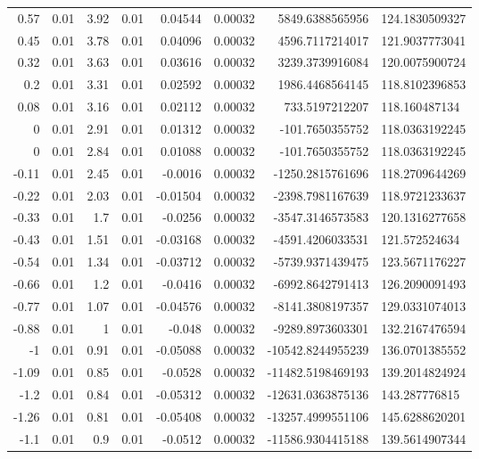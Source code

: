 \documentclass[a4paper]{article}
\begin{document}
\begin{table}[htbp]
\begin{tabular}{rlrlrlrl}
    0.57  & 0.01 & 3.92 & 0.01 & 0.04544  & 0.00032 & 5849.6388565956   & 124.1830509327 \\
    0.45  & 0.01 & 3.78 & 0.01 & 0.04096  & 0.00032 & 4596.7117214017   & 121.9037773041 \\
    0.32  & 0.01 & 3.63 & 0.01 & 0.03616  & 0.00032 & 3239.3739916084   & 120.0075900724 \\
    0.2   & 0.01 & 3.31 & 0.01 & 0.02592  & 0.00032 & 1986.4468564145   & 118.8102396853 \\
    0.08  & 0.01 & 3.16 & 0.01 & 0.02112  & 0.00032 & 733.5197212207    & 118.160487134  \\
    0     & 0.01 & 2.91 & 0.01 & 0.01312  & 0.00032 & -101.7650355752   & 118.0363192245 \\
    0     & 0.01 & 2.84 & 0.01 & 0.01088  & 0.00032 & -101.7650355752   & 118.0363192245 \\
    -0.11 & 0.01 & 2.45 & 0.01 & -0.0016  & 0.00032 & -1250.2815761696  & 118.2709644269 \\
    -0.22 & 0.01 & 2.03 & 0.01 & -0.01504 & 0.00032 & -2398.7981167639  & 118.9721233637 \\
    -0.33 & 0.01 & 1.7  & 0.01 & -0.0256  & 0.00032 & -3547.3146573583  & 120.1316277658 \\
    -0.43 & 0.01 & 1.51 & 0.01 & -0.03168 & 0.00032 & -4591.4206033531  & 121.572524634  \\
    -0.54 & 0.01 & 1.34 & 0.01 & -0.03712 & 0.00032 & -5739.9371439475  & 123.5671176227 \\
    -0.66 & 0.01 & 1.2  & 0.01 & -0.0416  & 0.00032 & -6992.8642791413  & 126.2090091493 \\
    -0.77 & 0.01 & 1.07 & 0.01 & -0.04576 & 0.00032 & -8141.3808197357  & 129.0331074013 \\
    -0.88 & 0.01 & 1    & 0.01 & -0.048   & 0.00032 & -9289.8973603301  & 132.2167476594 \\
    -1    & 0.01 & 0.91 & 0.01 & -0.05088 & 0.00032 & -10542.8244955239 & 136.0701385552 \\
    -1.09 & 0.01 & 0.85 & 0.01 & -0.0528  & 0.00032 & -11482.5198469193 & 139.2014824924 \\
    -1.2  & 0.01 & 0.84 & 0.01 & -0.05312 & 0.00032 & -12631.0363875136 & 143.287776815  \\
    -1.26 & 0.01 & 0.81 & 0.01 & -0.05408 & 0.00032 & -13257.4999551106 & 145.6288620201 \\
    -1.1  & 0.01 & 0.9  & 0.01 & -0.0512  & 0.00032 & -11586.9304415188 & 139.5614907344 \\

\end{tabular}
\end{table}
\end{document}
